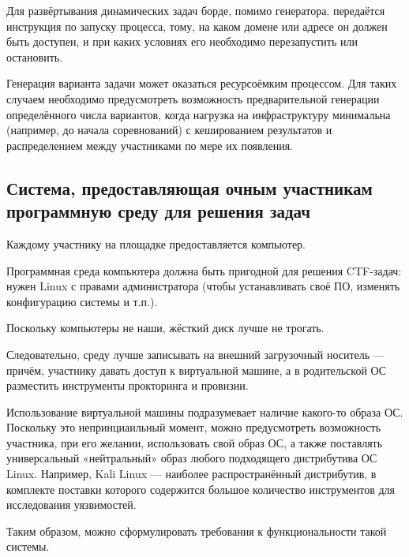 Для развёртывания динамических задач борде, помимо генератора, передаётся инструкция по запуску процесса, тому, на каком домене или адресе он должен быть доступен, и при каких условиях его необходимо перезапустить или остановить.

Генерация варианта задачи может оказаться ресурсоёмким процессом. Для таких случаем необходимо предусмотреть возможность предварительной генерации определённого числа вариантов, когда нагрузка на инфраструктуру минимальна (например, до начала соревнований) с кешированием результатов и распределением между участниками по мере их появления.

\subsection{Система, предоставляющая очным участникам программную среду для решения задач}

Каждому участнику на площадке предоставляется компьютер.

Программная среда компьютера должна быть пригодной для решения CTF-задач: нужен Linux с правами администратора (чтобы устанавливать своё ПО, изменять конфигурацию системы и т.п.).

Поскольку компьютеры не наши, жёсткий диск лучше не трогать.

Следовательно, среду лучше записывать на внешний загрузочный носитель — причём, участнику давать доступ к виртуальной машине, а в родительской ОС разместить инструменты прокторинга и провизии.

Использование виртуальной машины подразумевает наличие какого-то образа ОС. Поскольку это непринциаильный момент, можно предусмотреть возможность участника, при его желании, использовать свой образ ОС, а также поставлять универсальный «нейтральный» образ любого подходящего дистрибутива ОС Linux. Например, Kali Linux — наиболее распространённый дистрибутив, в комплекте поставки которого содержится большое количество инструментов для исследования уязвимостей.

Таким образом, можно сформулировать требования к функциональности такой системы.

